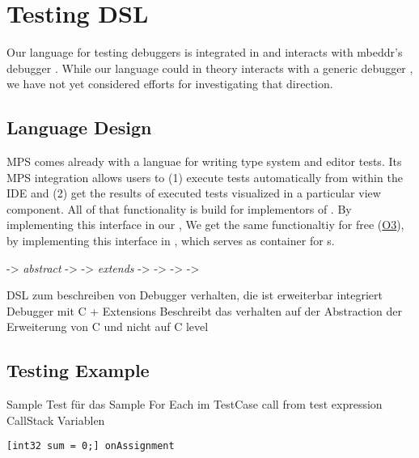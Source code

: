 \section{Testing DSL}

Our language for testing debuggers is integrated in  and interacts
with mbeddr's debugger . While our language could in theory interacts
with a generic debugger , we have not yet considered efforts for
investigating that direction.

\subsection{Language Design}

\ac{MPS} comes already with a languae for writing type system and editor tests.
Its \ac{MPS} integration allows users to (1) execute tests automatically from
within the \ac{IDE} and (2) get the results of executed tests visualized in a
particular view component. All of that functionality is build for implementors
of . By implementing this interface in our , 
We get the same functionaltiy for free (\hyperref[O3]{O3}), by implementing this
interface in , which serves as container for
s.



	-> \emph{abstract} -> 
	-> \emph{extends} ->  
	-> 
	-> 
	-> 



DSL zum beschreiben von Debugger verhalten, 
die ist erweiterbar integriert Debugger mit C + Extensions
Beschreibt das verhalten auf der Abstraction 
der Erweiterung von C und nicht auf C level 
	
\subsection{Testing Example}
Sample
	Test für das Sample
		For Each im TestCase call from test expression
			CallStack
			Variablen
			
\begin{lstlisting}[language=reducedMbeddr]
	[int32 sum = 0;] onAssignment
\end{lstlisting}			